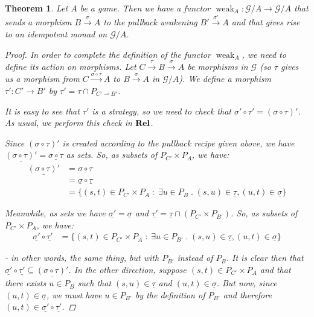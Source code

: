 \documentclass[11pt]{article} %
\theoremstyle{plain} %
\newtheorem{theorem}{Theorem}[section]
\theoremstyle{definition} %
\theoremstyle{note}
\theoremstyle{exercisestyle}
\newcommand{\catname}[1]{{\normalfont\textbf{#1}}}
\newcommand{\Rel}{\catname{Rel}}
\newcommand{\map}[3]{#2\xrightarrow{#1} #3}
\newcommand*\from{\colon}
\newcommand{\cmap}[3]{#1\from{}#2\to{}#3}
\renewcommand{\implies}{\multimap}
\newcommand{\comp}[2]{#1 \circ #2}
\newcommand{\G}{\mathcal G}
\newcommand{\suchthat}{\;\colon\;}
\newcommand{\esuchthat}{\;.\;}
\newcommand{\grel}[1]{\underline{#1}}
\renewcommand{\subset}{\subseteq}
\DeclareMathOperator{\weak}{weak}
\begin{document}
\begin{theorem}
  Let $A$ be a game.  Then we have a functor $\cmap{\weak_A}{\G/A}{\G/A}$ that sends a morphism $\map{\sigma}{B}{A}$ to the pullback weakening $\map{\sigma'}{B'}{A}$ and that gives rise to an idempotent monad on $\G/A$.

  \begin{proof}
    In order to complete the definition of the functor $\weak_A$, we need to define its action on morphisms.  Let $C\xrightarrow{\tau}\map{\sigma}{B}{A}$ be morphisms in $\G$ (so $\tau$ gives us a morphism from $\map{\comp\sigma\tau}{C}{A}$ to $\map{\sigma}{B}{A}$ in $\G/A$).  We define a morphism $\cmap{\tau'}{C'}{B'}$ by $\tau'=\tau\cap P_{C'\implies B'}$.

    It is easy to see that $\tau'$ is a strategy, so we need to check that $\comp{\sigma'}{\tau'}=(\comp\sigma\tau)'$.  As usual, we perform this check in $\Rel$.

    Since $(\comp\sigma\tau)'$ is created according to the pullback recipe given above, we have $\grel{(\comp\sigma\tau)'}=\grel{\comp\sigma\tau}$ as sets.  So, as subsets of $P_{C'}\times P_A$, we have:
    \begin{align*}
      \grel{(\comp\sigma\tau)'} & = \grel{\comp\sigma\tau} \\
                                & = \comp{\grel\sigma}{\grel\tau} \\
                                & = \{(s, t)\in P_{C'}\times P_{A}\suchthat \exists u\in P_B \esuchthat (s,u)\in\grel\tau, (u,t)\in\grel\sigma\}
    \end{align*}

    Meanwhile, as sets we have $\grel{\sigma'}=\grel\sigma$ and $\grel{\tau'}=\grel\tau\cap (P_{C'}\times P_{B'})$.  So, as subsets of $P_{C'}\times P_A$, we have:
    \begin{align*}
      \comp{\grel{\sigma'}}{\grel{\tau'}} & = \{(s, t)\in P_{C'}\times P_A\suchthat \exists u\in P_{B'} \esuchthat (s,u)\in\grel\tau, (u,t)\in\grel\sigma\}
    \end{align*}

     - in other words, the same thing, but with $P_{B'}$ instead of $P_B$.  It is clear then that $\comp{\grel{\sigma'}}{\grel{\tau'}}\subset\grel{(\comp\sigma\tau)'}$.  In the other direction, suppose $(s,t)\in P_{C'}\times P_A$ and that there exists $u\in P_B$ such that $(s,u)\in\grel\tau$ and $(u,t)\in\grel\sigma$.  But now, since $(u,t)\in\grel\sigma$, we must have $u\in P_{B'}$ by the definition of $P_{B'}$ and therefore $(u,t)\in \comp{\grel{\sigma'}}{\grel{\tau'}}$.


\end{proof}
\end{theorem}
\end{document}
